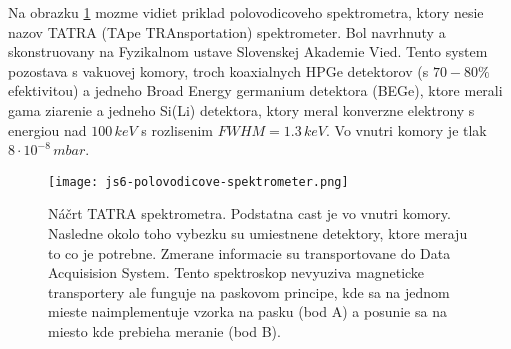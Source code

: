 \documentclass[../../main.tex]{subfiles}
\begin{document}
Na obrazku \ref{js6:fig:semiconductor_spectrometer} mozme vidiet priklad polovodicoveho spektrometra, ktory nesie nazov TATRA (TApe TRAnsportation) spektrometer. Bol navrhnuty a skonstruovany na Fyzikalnom ustave Slovenskej Akademie Vied. Tento system pozostava s vakuovej komory, troch koaxialnych HPGe detektorov (s $70-80\%$ efektivitou) a jedneho Broad Energy germanium detektora (BEGe), ktore merali gama ziarenie a jedneho Si(Li) detektora, ktory meral konverzne elektrony s energiou nad $100\,keV$ s rozlisenim $FWHM=1.3\,keV$. Vo vnutri komory je tlak $8\cdot 10^{-8}\,mbar$.

\begin{figure}[!h]
\centering
\texttt{[image: js6-polovodicove-spektrometer.png]}
\caption{Náčrt TATRA spektrometra. Podstatna cast je vo vnutri komory. Nasledne okolo toho vybezku su umiestnene detektory, ktore meraju to co je potrebne. Zmerane informacie su transportovane do Data Acquisision System. Tento spektroskop nevyuziva magneticke transportery ale funguje na paskovom principe, kde sa na jednom mieste naimplementuje vzorka na pasku (bod A) a posunie sa na miesto kde prebieha meranie (bod B).}
\label{js6:fig:semiconductor_spectrometer}
\end{figure}
\end{document}
